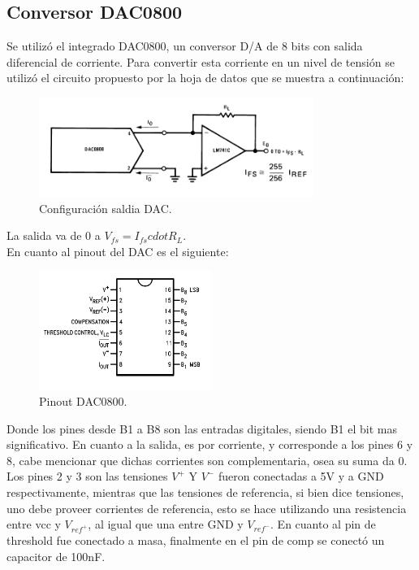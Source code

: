 \subsection{Conversor DAC0800}
Se utilizó el integrado DAC0800, un conversor D/A de 8 bits con salida diferencial de corriente.
Para convertir esta corriente en un nivel de tensión se utilizó el circuito propuesto por la hoja de datos que se muestra a continuación:
\begin{figure}[H]
	\centering
	\includegraphics[width=0.8\textwidth]{ImagenesEjercicio1/dacout.png}
\caption{Configuración saldia DAC.}
	\label{fig:dacout}
\end{figure}
La salida va de 0 a $V_{fs}= I_{fs}cdot R_L$.\\
En cuanto al pinout del DAC es el siguiente:
\begin{figure}[H]
	\centering
	\includegraphics[width=0.5\textwidth]{ImagenesEjercicio1/dacpinout.png}
\caption{Pinout DAC0800.}
	\label{fig:dapinout}
\end{figure}
Donde los pines desde B1 a B8 son las entradas digitales, siendo B1 el bit mas significativo. En cuanto a la salida, es por corriente, y corresponde a los pines 6 y 8, cabe mencionar que dichas corrientes son complementaria, osea su suma da 0. Los pines 2 y 3 son las tensiones $V^+$ Y $V^-$ fueron conectadas a 5V y a GND respectivamente, mientras que las tensiones de referencia, si bien dice tensiones, uno debe proveer corrientes de referencia, esto se hace utilizando una resistencia entre vcc y $V_{ref^+}$, al igual que una entre GND y $V_{ref^-}$. En cuanto al pin de threshold fue conectado a masa, finalmente en el pin de comp se conectó un capacitor de 100nF.

